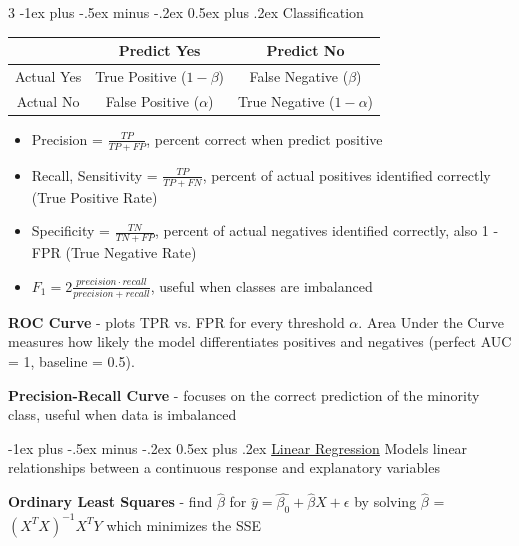 \documentclass[10pt,landscape,letterpaper]{article}
\makeatletter
\renewcommand{\section}{\@startsection{section}{1}{0mm}%
                                {-1ex plus -.5ex minus -.2ex}%
                                {0.5ex plus .2ex}%
                                {\normalfont\large\bfseries}}
\renewcommand{\subsection}{\@startsection{subsection}{2}{0mm}%
                                {-1ex plus -.5ex minus -.2ex}%
                                {0.5ex plus .2ex}%
                                {\normalfont\normalsize\bfseries}}
\makeatother
\begin{document}
\begin{multicols}{3}
\subsection{Classification}
\begin{center}
        \footnotesize
        \begin{tabular}{ |c|c|c| }
         \hline
          & Predict Yes & Predict No \\
         \hline
         Actual Yes & True Positive ($1-\beta$) & False Negative ($\beta$)  \\
         Actual No & False Positive ($\alpha$) & True Negative ($1-\alpha$) \\
         \hline
        \end{tabular}
        \end{center}
\vspace{-1mm}
\begin{itemize}[label={--},leftmargin=4mm]
    \vspace{-1mm}
    \itemsep -.4mm
    \item Precision = $\frac{TP}{TP + FP}$, percent correct when predict positive
    \item Recall, Sensitivity = $\frac{TP}{TP + FN}$, percent of actual positives identified correctly (True Positive Rate)
    \item Specificity = $\frac{TN}{TN + FP}$, percent of actual negatives identified correctly, also 1 - FPR (True Negative Rate)
    \item $F_1 = 2\frac{precision\cdot recall}{precision + recall}$, useful when classes are imbalanced
\end{itemize}


\textbf{ROC Curve} - plots TPR vs. FPR for every threshold $\alpha$. Area Under the Curve  measures how likely the model differentiates positives and negatives (perfect AUC = 1, baseline = 0.5).

\textbf{Precision-Recall Curve} - focuses on the correct prediction of the minority class, useful when data is imbalanced

\section{\href{https://migue-rc.github.io/Data-Science-Cheatsheet/\#linear-regression}{Linear Regression}}
Models linear relationships between a continuous response and explanatory variables

\textbf{Ordinary Least Squares} - find $\hat{\beta}$ for $\hat{y} = \hat{\beta_{0}} + \hat{\beta}X + \epsilon$
by solving $\hat{\beta}$ = $(X^{T}X)^{-1}X^{T}Y$ which minimizes the SSE


\end{multicols}
\end{document}
